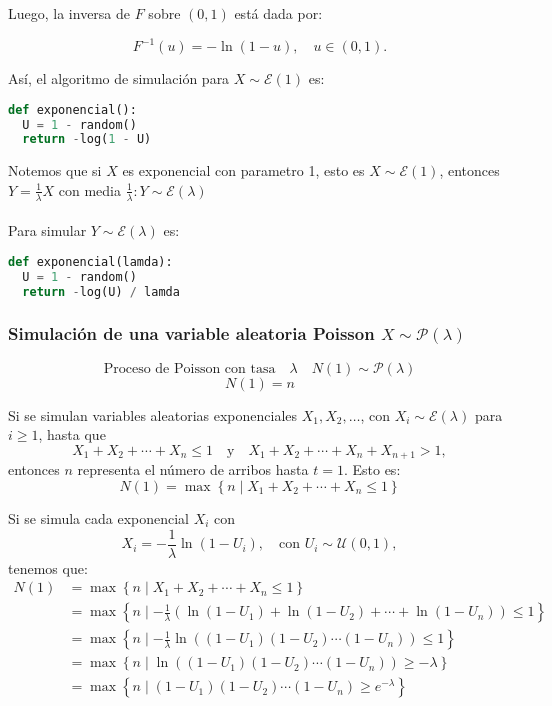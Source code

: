 \documentclass[11pt, a4paper]{article}
\theoremstyle{definition}
\begin{document}
Luego, la inversa de \( F \) sobre \( (0, 1) \) está dada por:

\[
F^{-1}(u) = -\ln(1 - u), \quad u \in (0, 1).
\]

Así, el algoritmo de simulación para \( X \sim \mathcal{E}(1) \) es:
\begin{lstlisting}[language=Python]
def exponencial():
  U = 1 - random()
  return -log(1 - U)
\end{lstlisting}
Notemos que si $X$ es exponencial con parametro 1, esto es \( X \sim \mathcal{E}(1) \), 
entonces \( Y = \frac{1}{\lambda } X \) con media \(\frac{1}{\lambda}: Y \sim \mathcal{E}(\lambda)\)
\\ \\
Para simular \( Y \sim \mathcal{E}(\lambda)\) es: 
\begin{lstlisting}[language=Python]
def exponencial(lamda):
  U = 1 - random()
  return -log(U) / lamda
\end{lstlisting}

\newpage

\subsubsection{Simulación de una variable aleatoria Poisson $X \sim \mathcal{P} (\lambda)$}

\[
\text{Proceso de Poisson con tasa}\quad \lambda \quad N(1) \sim \mathcal{P}(\lambda)
\]
\[
N(1) = n
\]

Si se simulan variables aleatorias exponenciales \(X_1, X_2, \ldots\), con \(X_i \sim \mathcal{E}(\lambda)\) para \(i \geq 1\), hasta que
\[
X_1 + X_2 + \cdots + X_n \leq 1 \quad \text{y} \quad X_1 + X_2 + \cdots + X_n + X_{n+1} > 1,
\]
entonces \(n\) representa el número de arribos hasta \(t = 1\). Esto es:
\[
N(1) = \max\left\{n \mid X_1 + X_2 + \cdots + X_n \leq 1 \right\}
\]

\bigskip

Si se simula cada exponencial \(X_i\) con
\[
X_i = -\frac{1}{\lambda} \ln(1 - U_i), \quad \text{con } U_i \sim \mathcal{U}(0,1),
\]
tenemos que:
\begin{align*}
N(1) &= \max\left\{n \mid X_1 + X_2 + \cdots + X_n \leq 1 \right\} \\
&= \max\left\{n \mid -\frac{1}{\lambda} \left( \ln(1 - U_1) + \ln(1 - U_2) + \cdots + \ln(1 - U_n) \right) \leq 1 \right\} \\
&= \max\left\{n \mid -\frac{1}{\lambda} \ln\left( (1 - U_1)(1 - U_2) \cdots (1 - U_n) \right) \leq 1 \right\} \\
&= \max\left\{n \mid \ln\left( (1 - U_1)(1 - U_2) \cdots (1 - U_n) \right) \geq -\lambda \right\} \\
&= \max\left\{n \mid (1 - U_1)(1 - U_2) \cdots (1 - U_n) \geq e^{-\lambda} \right\}
\end{align*}
\end{document}
